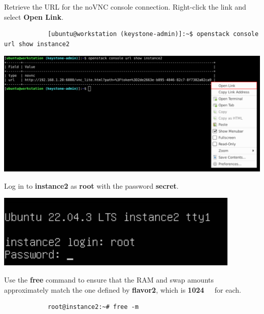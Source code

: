 \documentclass[letterpaper, 12pt]{article}
\begin{document}
\begin{enumerate}
    \begin{labstep}
        Retrieve the URL for the noVNC console connection.
        Right-click the link and select \textbf{Open Link}.
        \begin{lstlisting}
            [ubuntu@workstation (keystone-admin)]:~$ openstack console url show instance2
        \end{lstlisting}

        \begin{center}
            \includegraphics[width=\linewidth]{images/part5/step5.png}
        \end{center}
    \end{labstep}

    \begin{labstep}
        Log in to \textbf{instance2} as \textbf{root} with the password \textbf{secret}.

        \begin{center}
            \includegraphics[width=\linewidth]{images/part5/step6.png}
        \end{center}
    \end{labstep}

    \begin{labstep}
        Use the \textbf{free} command to ensure that the RAM and swap amounts approximately match the one defined by \textbf{flavor2}, which is \textbf{\qty{1024}{\mega\byte}} for each.
        \begin{lstlisting}
            root@instance2:~# free -m
        \end{lstlisting}


\end{labstep}
\end{enumerate}
\end{document}
